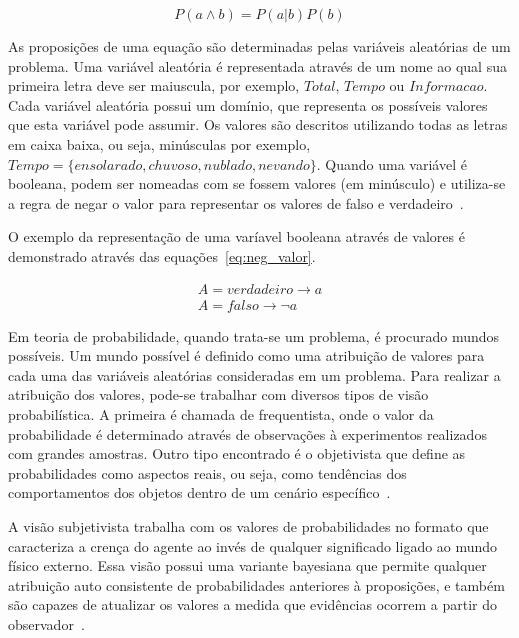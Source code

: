 \begin{equation}
    \label{eq:prob_condicional_a_b_2}
    P(a \land b) = P(a|b)P(b)
\end{equation}

As proposições de uma equação são determinadas pelas variáveis aleatórias de um problema. Uma variável aleatória é representada através de um nome ao qual sua primeira letra deve ser maiuscula, por exemplo, $Total$, $Tempo$ ou $Informacao$. Cada variável aleatória possui um domínio, que representa os possíveis valores que esta variável pode assumir. Os valores são descritos utilizando todas as letras em caixa baixa, ou seja, minúsculas por exemplo, $Tempo = \{ ensolarado, chuvoso, nublado, nevando \}$. Quando uma variável é booleana, podem ser nomeadas com se fossem valores (em minúsculo) e utiliza-se a regra de negar o valor para representar os valores de falso e verdadeiro~\cite{russell:2002}.

O exemplo da representação de uma varíavel booleana através de valores é demonstrado através das equações~\ref{eq:neg_valor}.

\begin{subequations}
    \label{eq:neg_valor}
    \begin{align}
        A = verdadeiro \rightarrow a\\
        A = falso \rightarrow \neg a
    \end{align}
\end{subequations}

Em teoria de probabilidade, quando trata-se um problema, é procurado mundos possíveis. Um mundo possível é definido como uma atribuição de valores para cada uma das variáveis aleatórias consideradas em um problema. Para realizar a atribuição dos valores, pode-se trabalhar com diversos tipos de visão probabilística. A primeira é chamada de frequentista, onde o valor da probabilidade é determinado através de observações à experimentos realizados com grandes amostras. Outro tipo encontrado é o objetivista que define as probabilidades como aspectos reais, ou seja, como tendências dos comportamentos dos objetos dentro de um cenário específico~\cite{russell:2002, faceli:2011}.

A visão subjetivista trabalha com os valores de probabilidades no formato que caracteriza a crença do agente ao invés de qualquer significado ligado ao mundo físico externo. Essa visão possui uma variante bayesiana que permite qualquer atribuição auto consistente de probabilidades anteriores à proposições, e também são capazes de atualizar os valores a medida que evidências ocorrem a partir do observador~\cite{russell:2002}.

